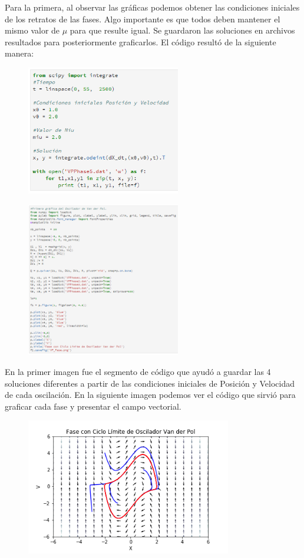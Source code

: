 \documentclass[a4paper]{article}
\begin{document}
Para la primera, al observar las gráficas podemos obtener las condiciones iniciales de los retratos de las fases. Algo importante es que todos deben mantener el mismo valor de $\mu$ para que resulte igual. Se guardaron las soluciones en archivos resultados para posteriormente graficarlos. El código resultó de la siguiente manera:
\begin{figure}[ht!]
 \centering
  \includegraphics[width=0.6\textwidth]{Codigo2.PNG}
\end{figure}
\pagebreak
\begin{figure}[ht!]
 \centering
  \includegraphics[width=0.6\textwidth]{Codigo3.PNG}
\end{figure}

En la primer imagen fue el segmento de código que ayudó a guardar las 4 soluciones diferentes a partir de las condiciones iniciales de Posición y Velocidad de cada oscilación. En la siguiente imagen podemos ver el código que sirvió para graficar cada fase y presentar el campo vectorial.

\begin{figure}[ht!]
 \centering
  \includegraphics[width=0.8\textwidth]{VP_Fase.png}
\end{figure}
\end{document}
